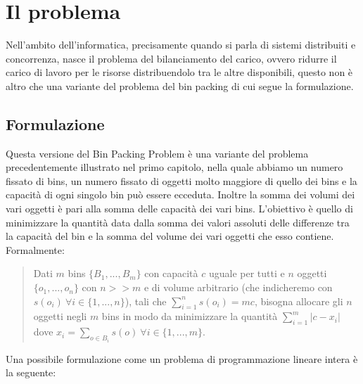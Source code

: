 \section{Il problema}
Nell'ambito dell'informatica, precisamente quando si parla di sistemi distribuiti e concorrenza, nasce il problema
del bilanciamento del carico, ovvero ridurre il carico di lavoro per le risorse distribuendolo tra le altre disponibili, questo 
non è altro che una variante del problema del bin packing di cui segue la formulazione.

\subsection{Formulazione}
Questa versione del Bin Packing Problem è una variante del problema precedentemente illustrato nel primo capitolo, nella quale abbiamo un numero
fissato di bins, un numero fissato di oggetti molto maggiore di quello dei bins e la capacità di ogni singolo bin può essere ecceduta.
Inoltre la somma dei volumi dei vari oggetti è pari alla somma delle capacità dei vari bins.
L'obiettivo è quello di minimizzare la quantità data dalla somma dei valori assoluti delle differenze tra la capacità del bin e la somma del
volume dei vari oggetti che esso contiene. \\
Formalmente:
\begin{quote}
	Dati $ m $ bins $ \{B_1, ..., B_m\} $ con capacità $ c $ uguale per tutti e $ n $ oggetti $ \{o_1, ..., o_n\} $ con $ n >> m $ e di volume
	arbitrario (che indicheremo con $ s(o_i) \: \forall i \in \{1, ..., n\} $), tali che $ \displaystyle\sum\limits_{i=1}^{n} s(o_i) = mc $,
	bisogna allocare gli $ n $ oggetti negli $ m $ bins in modo da minimizzare la quantità $ \displaystyle\sum\limits_{i=1}^{m} |c - x_i| $
	dove $ x_i = \displaystyle\sum\limits_{o \in B_i} s(o) \: \forall i \in \{1, ..., m\} $.
\end{quote}
Una possibile formulazione come un problema di programmazione lineare intera è la seguente:

